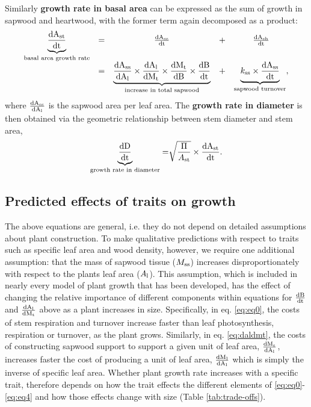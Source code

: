 \documentclass[a4paper,11pt]{article}
\newcommand{\ud}{\ensuremath{\rm{d}}}
\begin{document}
Similarly \textbf{growth rate in basal area} can be expressed as the sum of growth in sapwood and heartwood, with the former term again decomposed as a product:
\begin{equation}\label{eq:eq3}
\begin{array}{ccccc}
\underbrace{{\frac{\ud A_{\rm st}}{\ud t}}}_{\text{basal area growth rate}} &=& \frac{\ud A_{\rm ss}}{\ud t} &+& \frac{\ud A_{\rm sh}}{\ud t} \\
&=& \underbrace{\frac{\ud A_{\rm ss}}{\ud A_{\rm l}}  \times {\frac{\ud A_{\rm l}}{\ud M_{\rm t}}} \times  {\frac{\ud M_{\rm t}}{\ud B}} \times {\frac{\ud B}{\ud t}}}_{\text{increase in total sapwood}} &+&  \underbrace{k_{\rm ss} \times \frac{\ud A_{\rm ss}}{\ud t}}_{\text{sapwood turnover}},\\
\end{array}
\end{equation}
where $\frac{\ud A_{\rm ss}}{\ud A_{\rm l}} $ is the  sapwood area per leaf area. The \textbf{growth rate in diameter} is then obtained via the geometric relationship between stem diameter and stem area,
\begin{equation}\label{eq:eq4}
\underbrace{\frac{\ud D}{\ud t}}_{\text{growth rate in diameter}} = \sqrt[]{\frac{\Pi}{A_{\rm st}}} \times {\frac{\ud A_{\rm st}}{\ud t}}.
\end{equation}

\subsection*{Predicted effects of traits on growth}

The above equations are general, i.e. they do not depend on detailed assumptions about plant construction. To make qualitative predictions with respect to traits such as specific leaf area and wood density, however, we require one additional assumption: that the mass of sapwood tissue ($M_{\rm ss}$) increases disproportionately with respect to the plants leaf area ($A_{\rm l}$). This assumption, which is included in nearly every model of plant growth that has been developed, has the effect of changing the relative importance of different components within equations for $\frac{\ud B}{\ud t}$ and $\frac{\ud A_{\rm l}}{\ud M_{\rm t}}$ above as a plant increases in size. Specifically, in eq. \ref{eq:eq0}, the costs of stem respiration and turnover increase faster than leaf photosynthesis, respiration or turnover, as the plant grows. Similarly, in eq. \ref{eq:daldmt}, the costs of constructing sapwood support to support a given unit of leaf area, $\frac{\ud M_{\rm s}}{\ud A_{\rm l}}$, increases faster the cost of producing a unit of leaf area, $\frac{\ud M_{\rm l}}{\ud A_{\rm l}}$ which is simply the inverse of specific leaf area. Whether plant growth rate increases with a specific trait, therefore depends on how the trait effects the different elements of \ref{eq:eq0}-\ref{eq:eq4} and how those effects change with size (Table \ref{tab:trade-offs}).
\end{document}
